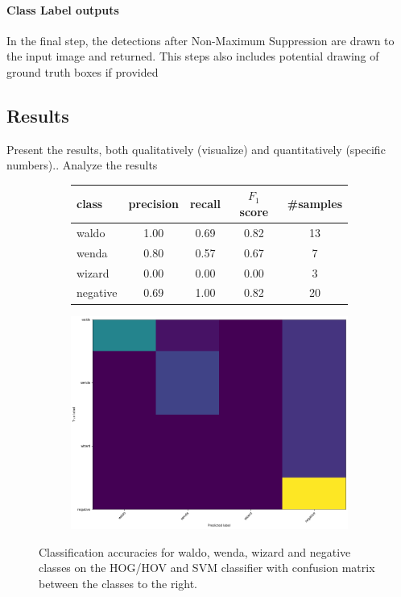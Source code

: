 \documentclass[11pt]{article}
\begin{document}
\paragraph{Class Label outputs}
In the final step, the detections after Non-Maximum Suppression are drawn to the input image and returned. 
This steps also includes potential drawing of ground truth boxes if provided

\subsection{Results}\label{subsec:results}
Present the results, both qualitatively (visualize) and quantitatively (specific numbers)..
Analyze the results

\begin{figure}[]
    \centering
    \begin{subfigure}{0.6\linewidth}
    \begin{tabular}{lcccc}
        \toprule
        class & precision & recall & \( F_1 \) score & \#samples \\
        \midrule
           waldo &  1.00 &  0.69 & 0.82 &  13 \\
           wenda &  0.80 &  0.57 & 0.67 &   7 \\
          wizard &  0.00 &  0.00 & 0.00 &   3 \\
        negative &  0.69 &  1.00 & 0.82 &  20 \\
        \bottomrule
    \end{tabular}
    \end{subfigure}
    \begin{subfigure}{0.35\linewidth}
    \includegraphics[width =\linewidth]{figures/confusion_matrix}
    \end{subfigure}

    \caption{Classification accuracies for waldo, wenda, wizard and negative classes on the HOG/HOV and SVM classifier
    with confusion matrix between the classes to the right.}
    \label{tab:classification_acc}
\end{figure}
\end{document}
